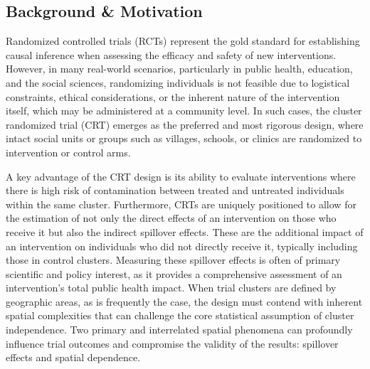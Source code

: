 \documentclass{article}[11pt]
\begin{document}

\subsection{Background \& Motivation}

Randomized controlled trials (RCTs) represent the gold standard for establishing causal inference when assessing the efficacy and safety of new interventions\cite{pocock_clinical_1983}\cite{smith_field_2015}. However, in many real-world scenarios, particularly in public health, education, and the social sciences, randomizing individuals is not feasible due to logistical constraints, ethical considerations, or the inherent nature of the intervention itself, which may be administered at a community level. In such cases, the cluster randomized trial (CRT) emerges as the preferred and most rigorous design, where intact social units or groups such as villages, schools, or clinics are randomized to intervention or control arms\cite{hayes_cluster_2017}\cite{donner_design_2000}.

A key advantage of the CRT design is its ability to evaluate interventions where there is high risk of contamination between treated and untreated individuals within the same cluster\cite{hayes_cluster_2017}\cite{hudgens_toward_2008}. Furthermore, CRTs are uniquely positioned to allow for the estimation of not only the direct effects of an intervention on those who receive it but also the indirect spillover effects. These are the additional impact of an intervention on individuals who did not directly receive it, typically including those in control clusters. Measuring these spillover effects is often of primary scientific and policy interest, as it provides a comprehensive assessment of an intervention's total public health impact\cite{hayes_cluster_2017}\cite{hayes_design_2000}. When trial clusters are defined by geographic areas, as is frequently the case, the design must contend with inherent spatial complexities that can challenge the core statistical assumption of cluster independence. Two primary and interrelated spatial phenomena can profoundly influence trial outcomes and compromise the validity of the results: spillover effects and spatial dependence\cite{hayes_cluster_2017}\cite{smith_field_2015}.
\end{document}
